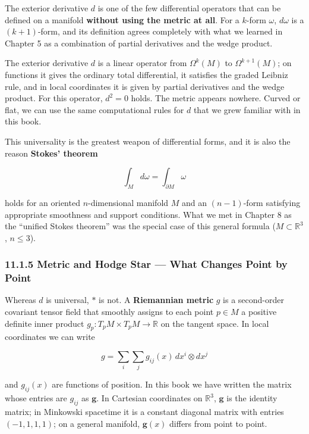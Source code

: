 \documentclass[a4paper,12pt,openany]{book}
\begin{document}
The exterior derivative \(d\) is one of the few differential operators
that can be defined on a manifold \textbf{without using the metric at
all}. For a \(k\)-form \(\omega\), \(d\omega\) is a \((k+1)\)-form, and
its definition agrees completely with what we learned in Chapter 5 as a
combination of partial derivatives and the wedge product.

The exterior derivative \(d\) is a linear operator from \(\Omega^k(M)\)
to \(\Omega^{k+1}(M)\); on functions it gives the ordinary total
differential, it satisfies the graded Leibniz rule, and in local
coordinates it is given by partial derivatives and the wedge product.
For this operator, \(d^2 = 0\) holds. The metric appears nowhere. Curved
or flat, we can use the same computational rules for \(d\) that we grew
familiar with in this book.

This universality is the greatest weapon of differential forms, and it
is also the reason \textbf{Stokes' theorem}

\[\int_M d\omega = \int_{\partial M} \omega\]

holds for an oriented \(n\)-dimensional manifold \(M\) and an
\((n-1)\)-form satisfying appropriate smoothness and support conditions.
What we met in Chapter 8 as the ``unified Stokes theorem'' was the
special case of this general formula (\(M \subset \mathbb{R}^3\),
\(n \le 3\)).

\hypertarget{metric-and-hodge-star-what-changes-point-by-point}{%
\subsubsection{11.1.5 Metric and Hodge Star — What Changes Point by
Point}\label{metric-and-hodge-star-what-changes-point-by-point}}

Whereas \(d\) is universal, \(\ast\) is not. A \textbf{Riemannian
metric} \(g\) is a second-order covariant tensor field that smoothly
assigns to each point \(p \in M\) a positive definite inner product
\(g_p: T_p M \times T_p M \to \mathbb{R}\) on the tangent space. In
local coordinates we can write

\[g = \sum_i\sum_j g_{ij}(x)\,dx^i \otimes dx^j\]

and \(g_{ij}(x)\) are functions of position. In this book we have
written the matrix whose entries are \(g_{ij}\) as \(\mathbf{g}\). In
Cartesian coordinates on \(\mathbb{R}^3\), \(\mathbf{g}\) is the
identity matrix; in Minkowski spacetime it is a constant diagonal matrix
with entries \((-1,1,1,1)\); on a general manifold, \(\mathbf{g}(x)\)
differs from point to point.
\end{document}
